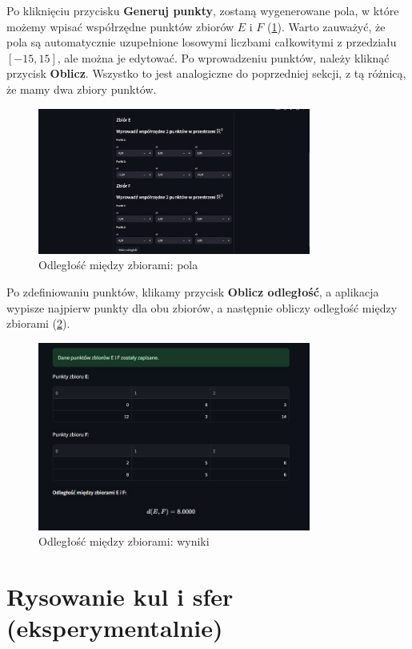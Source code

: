 \documentclass[article,11pt]{mwrep}
\begin{document}
Po kliknięciu przycisku \textbf{Generuj punkty}, zostaną wygenerowane pola, w które możemy wpisać współrzędne punktów zbiorów $E$ i $F$ (\ref{rys:op}). Warto zauważyć, że pola są automatycznie uzupełnione losowymi liczbami całkowitymi z przedziału $[-15,15]$, ale można je edytować. Po wprowadzeniu punktów, należy kliknąć przycisk \textbf{Oblicz}. Wszystko to jest analogiczne do poprzedniej sekcji, z tą różnicą, że mamy dwa zbiory punktów.

\begin{figure}[H] 
    \centering
    \includegraphics[width=0.8\textwidth]{figure/Screenshot_6.jpg}
    \caption{Odległość między zbiorami: pola}\label{rys:op}
\end{figure}

Po zdefiniowaniu punktów, klikamy przycisk \textbf{Oblicz odległość}, a aplikacja wypisze najpierw punkty dla obu zbiorów, a następnie obliczy odległość między zbiorami (\ref{rys:ow}).

\begin{figure}[H] 
    \centering
    \includegraphics[width=0.8\textwidth]{figure/Screenshot_7.jpg}
    \caption{Odległość między zbiorami: wyniki}\label{rys:ow}
\end{figure}

\chapter{Rysowanie kul i sfer (eksperymentalnie)}
\end{document}
